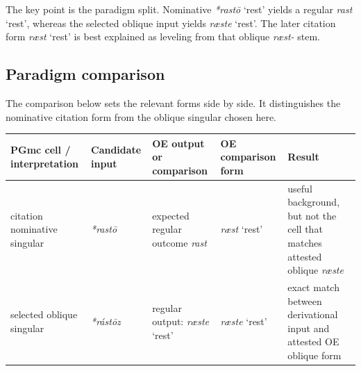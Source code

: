 \documentclass[
  british,
  a4paper,
  openany]{book}
\newcounter{none} %
\providecommand{\Recon}[1]{\emph{*#1}}
{\catcode`→=\active \global\def→{\ensuremath{\rightarrow}}}
\providecommand{\Recon}[1]{\emph{*#1}}
{\catcode`→=\active \global\def→{\ensuremath{\rightarrow}}}
\begin{document}
The key point is the paradigm split. Nominative \Recon{rastō} `rest'
yields a regular \emph{rast} `rest', whereas the selected oblique input
yields \emph{ræste} `rest'. The later citation form \emph{ræst} `rest'
is best explained as leveling from that oblique \emph{ræst-} stem.

\subsection{Paradigm comparison}\label{paradigm-comparison-13}

The comparison below sets the relevant forms side by side. It
distinguishes the nominative citation form from the oblique singular
chosen here.

{\def\LTcaptype{none} %
\begin{longtable}[]{@{}
  >{\raggedright\arraybackslash}p{}
  >{\raggedright\arraybackslash}p{}
  >{\raggedright\arraybackslash}p{}
  >{\raggedright\arraybackslash}p{}
  >{\raggedright\arraybackslash}p{}@{}}
\toprule\noalign{}
\begin{minipage}[b]{\linewidth}\raggedright
PGmc cell / interpretation
\end{minipage} & \begin{minipage}[b]{\linewidth}\raggedright
Candidate input
\end{minipage} & \begin{minipage}[b]{\linewidth}\raggedright
OE output or comparison
\end{minipage} & \begin{minipage}[b]{\linewidth}\raggedright
OE comparison form
\end{minipage} & \begin{minipage}[b]{\linewidth}\raggedright
Result
\end{minipage} \\
\midrule\noalign{}
\endhead
\bottomrule\noalign{}
\endlastfoot
citation nominative singular & {\emph{*rastō}} & expected regular
outcome \emph{rast} & {\emph{ræst}} `rest' & useful background, but not
the cell that matches attested oblique \emph{ræste} \\
selected oblique singular & {\emph{*rástōz}} & regular output:
{\emph{ræste}} `rest' & {\emph{ræste}} `rest' & exact match between
derivational input and attested OE oblique form \\
\end{longtable}
}
\end{document}
